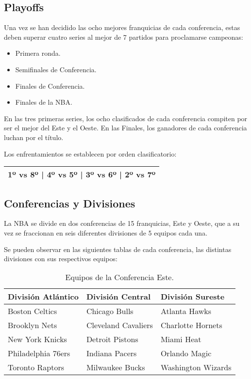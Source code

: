 \subsection{Playoffs}
Una vez se han decidido las ocho mejores franquicias de cada conferencia, estas deben superar cuatro series al mejor de 7 partidos para proclamarse campeonas:
\begin{itemize}
\tightlist
    \item
         Primera ronda.
    \item 
         Semifinales de Conferencia.
    \item 
         Finales de Conferencia.
    \item 
         Finales de la NBA.
\end{itemize}
En las tres primeras series, los ocho clasificados de cada conferencia compiten por ser el mejor del Este y el Oeste. En las Finales, los ganadores de cada conferencia luchan por el título.

Los enfrentamientos se establecen por orden clasificatorio:

\begin{tabular}{|c|}
\hline
1º vs 8º | 4º vs 5º | 3º vs 6º | 2º vs 7º \\
\hline
\end{tabular}
        
\subsection{Conferencias y Divisiones}
La NBA se divide en dos conferencias de 15 franquicias, Este y Oeste, que a su vez se fraccionan en seis diferentes divisiones de 5 equipos cada una.

Se pueden observar en las siguientes tablas de cada conferencia, las distintas divisiones con sus respectivos equipos:

\begin{table}[h]
    \centering
    \begin{tabular}{|>{\centering\arraybackslash}m{4cm}|>{\centering\arraybackslash}m{4cm}|>{\centering\arraybackslash}m{4cm}|}
        \hline
        \rowcolor[rgb]{0.81,0.81,0.77}
        \textbf{División Atlántico} & \textbf{División Central} & \textbf{División Sureste} \\
        \hline
        Boston Celtics & Chicago Bulls & Atlanta Hawks \\
        Brooklyn Nets & Cleveland Cavaliers & Charlotte Hornets \\
        New York Knicks & Detroit Pistons & Miami Heat \\
        Philadelphia 76ers & Indiana Pacers & Orlando Magic \\
        Toronto Raptors & Milwaukee Bucks & Washington Wizards \\
        \hline
    \end{tabular}
    \caption{Equipos de la Conferencia Este.}
    \label{tabla:conferencia-este}
\end{table}

